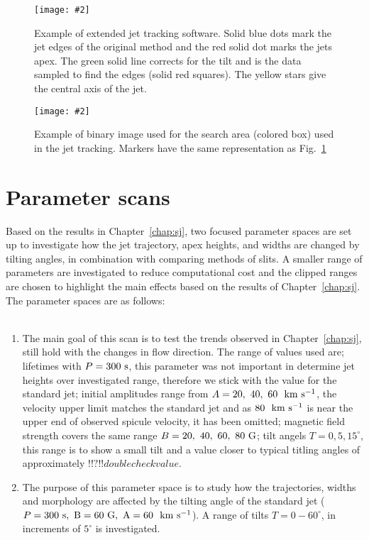 \documentclass[12pt]{ociamthesis}
\newcommand{\mfig}[4]{
  \begin{figure}
  \begin{center}
  \texttt{[image: \#2]}
  \caption{#3}
  \label{#4}
  \end{center}
  \end{figure}}
\newcommand{\kms}{~\rm{km ~s^{-1}}}
\newcommand{\np}{\\ \\}
\begin{document}
\mfig{1}{figures/jet_P300_B60A_60T_0039.png}{Example of extended jet tracking software. Solid blue dots mark the jet edges of the original method and the red solid dot marks the jets apex. The green solid line corrects for the tilt and is the data sampled to find the edges (solid red squares). The yellow stars give the central axis of the jet.}{imporved_j_track_example}
\mfig{1}{figures/example_of_tilt_jet_code.png}{Example of binary image used for the search area (colored box) used in the jet tracking. Markers have the same representation as Fig.~\ref{imporved_j_track_example}}{search_box_j_track_example}
\section{Parameter scans}
\label{sec:pscansII}
Based on the results in Chapter~\ref{chap:sj}, two focused parameter spaces are set up to investigate how the jet trajectory, apex heights, and widths are changed by tilting angles, in combination with comparing methods of slits. A smaller range of parameters are investigated to reduce computational cost and the clipped ranges are chosen to highlight the main effects based on the results of Chapter~\ref{chap:sj}. The parameter spaces are as follows: \np
\begin{enumerate}
\item The main goal of this scan is to test the trends observed in Chapter~\ref{chap:sj}, still hold with the changes in flow direction. The range of values used are; lifetimes with $P=300~\rm{s}$, this parameter was not important in determine jet heights over investigated range, therefore we stick with the value for the standard jet; initial amplitudes range from $A=20,~40,~60~\kms$, the  velocity upper limit matches the standard jet and as $80~\kms$ is near the upper end of observed spicule velocity, it has been omitted; magnetic field strength covers the same range $B=20,~40,~60,~80~\rm{G}$; tilt angels $T=0,5,15^{\circ}$, this range is to show a small tilt and a value closer to typical titling angles of approximately $!!?!!double check value$.  

\item The purpose of this parameter space is to study how the trajectories, widths and morphology are affected by the tilting angle of the standard jet ($P=300~\rm{s}, ~B=60~\rm{G}, ~A=60~\kms$). A range of tilts $T=0-60^{\circ}$, in increments of $5^{\circ}$ is investigated.   
\end{enumerate}
%
\end{document}

